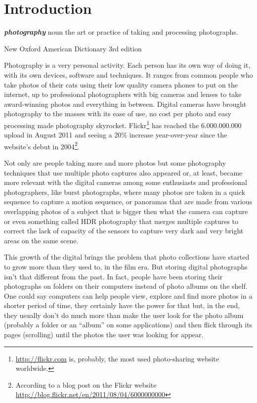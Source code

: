 \chapter{Introduction} %
\label{chapter:introduction}



\setlength{\epigraphwidth}{.5\textwidth}
\setlength{\afterepigraphskip}{\baselineskip}

\epigraph{\emph{\textbf{photography}}\newline
noun\newline
the art or practice of taking and processing photographs.}{\footnotesize New Oxford American Dictionary 3rd edition}

Photography is a very personal activity. Each person has its own way of doing it, with its own devices, software and techniques. It ranges from common people who take photos of their cats using their low quality camera phones to put on the internet, up to professional photographers with big cameras and lenses to take award-winning photos and everything in between. Digital cameras have brought photography to the masses with its ease of use, no cost per photo and easy processing made photography skyrocket. Flickr\footnote{\url{http://flickr.com} is, probably, the most used photo-sharing website worldwide.} has reached the 6.000.000.000 upload in August 2011 and seeing a 20\% increase year-over-year since the website's debut in 2004\footnote{According to a blog post on the Flickr website \url{http://blog.flickr.net/en/2011/08/04/6000000000}}.

Not only are people taking more and more photos but some photography techniques that use multiple photo captures also appeared or, at least, became more relevant with the digital cameras among some enthusiasts and professional photographers, like burst photographs, where many photos are taken in a quick sequence to capture a motion sequence, or panoramas that are made from various overlapping photos of a subject that is bigger then what the camera can capture or even something called \acf{HDR} photography that merges multiple captures to correct the lack of capacity of the sensors to capture very dark and very bright areas on the same scene.

This growth of the digital brings the problem that photo collections have started to grow more than they used to, in the film era. But storing digital photographs isn't that different from the past. In fact, people have been storing their photographs on folders on their computers instead of photo albums on the shelf. One could say computers can help people view, explore and find more photos in a shorter period of time, they certainly have the power for that but, in the end, they usually don't do much more than make the user look for the photo album (probably a folder or an ``album'' on some applications) and then flick through its pages (scrolling) until the photos the user was looking for appear.

